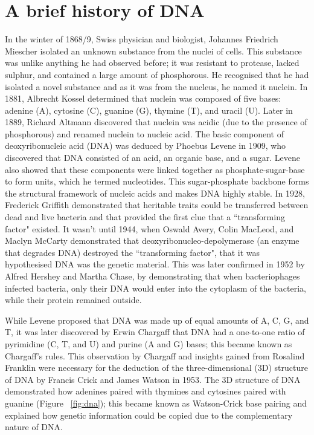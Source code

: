 \section{A brief history of DNA}

In the winter of 1868/9, Swiss physician and biologist, Johannes Friedrich Miescher isolated an unknown substance from the nuclei of cells\cite{dahm2008discovering}. This substance was unlike anything he had observed before; it was resistant to protease, lacked sulphur, and contained a large amount of phosphorous. He recognised that he had isolated a novel substance and as it was from the nucleus, he named it nuclein. In 1881, Albrecht Kossel determined that nuclein was composed of five bases: adenine (A), cytosine (C), guanine (G), thymine (T), and uracil (U). Later in 1889, Richard Altmann discovered that nuclein was acidic (due to the presence of phosphorous) and renamed nuclein to nucleic acid. The basic component of deoxyribonucleic acid (DNA) was deduced by Phoebus Levene in 1909, who discovered that DNA consisted of an acid, an organic base, and a sugar. Levene also showed that these components were linked together as phosphate-sugar-base to form units, which he termed nucleotides. This sugar-phosphate backbone forms the structural framework of nucleic acids and makes DNA highly stable. In 1928, Frederick Griffith demonstrated that heritable traits could be transferred between dead and live bacteria and that provided the first clue that a ``transforming factor" existed\cite{griffith1928significance}. It wasn't until 1944, when Oswald Avery, Colin MacLeod, and Maclyn McCarty demonstrated that deoxyribonucleo-depolymerase (an enzyme that degrades DNA) destroyed the ``transforming factor", that it was hypothesised DNA was the genetic material\cite{avery1944studies}. This was later confirmed in 1952 by Alfred Hershey and Martha Chase, by demonstrating that when bacteriophages infected bacteria, only their DNA would enter into the cytoplasm of the bacteria, while their protein remained outside\cite{hershey1952independent}.

While Levene proposed that DNA was made up of equal amounts of A, C, G, and T, it was later discovered by Erwin Chargaff that DNA had a one-to-one ratio of pyrimidine (C, T, and U) and purine (A and G) bases\cite{pmid14938364, pmid14945441}; this became known as Chargaff's rules. This observation by Chargaff and insights gained from Rosalind Franklin were necessary for the deduction of the three-dimensional (3D) structure of DNA by Francis Crick and James Watson in 1953\cite{WATSON_1953}. The 3D structure of DNA demonstrated how adenines paired with thymines and cytosines paired with guanine (Figure ~\ref{fig:dna}); this became known as Watson-Crick base pairing and explained how genetic information could be copied due to the complementary nature of DNA.

